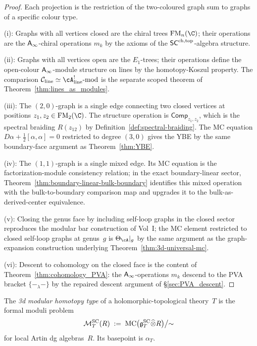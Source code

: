 \begin{proof}
Each projection is the restriction of the two-coloured graph sum
to graphs of a specific colour type.

(i): Graphs with all vertices closed are the chiral trees
$\FM_n(\C)$; their operations are the $\mathsf{A}_{\infty}$-chiral operations
$m_k$ by the axioms of the $\mathsf{SC}^{\mathrm{ch,top}}$-algebra structure.

(ii): Graphs with all vertices open are the $E_1$-trees; their
operations define the open-colour $\mathsf{A}_{\infty}$-module structure on lines
by the homotopy-Koszul property. The comparison
$\cC_{\mathrm{line}} \simeq \cA^!_{\mathrm{line}}\text{-mod}$ is the
separate scoped theorem of Theorem~\ref{thm:lines_as_modules}.

(iii): The $(2,0)$-graph is a single edge connecting two closed
vertices at positions $z_1, z_2 \in \FM_2(\C)$. The structure
operation is $\mathsf{Comp}_{z_1,z_2}$, which is the spectral
braiding $R(z_{12})$ by Definition~\ref{def:spectral-braiding}.
The MC equation $D\alpha + \tfrac{1}{2}[\alpha,\alpha] = 0$
restricted to degree $(3,0)$ gives the YBE by the same
boundary-face argument as Theorem~\ref{thm:YBE}.

(iv): The $(1,1)$-graph is a single mixed edge. Its MC equation is
the factorization-module consistency relation; in the exact
boundary-linear sector,
Theorem~\ref{thm:boundary-linear-bulk-boundary} identifies this
mixed operation with the bulk-to-boundary comparison map and upgrades
it to the bulk-as-derived-center equivalence.

(v): Closing the genus face by including self-loop graphs in the
closed sector reproduces the modular bar construction of Vol~I;
the MC element restricted to closed self-loop graphs at genus~$g$
is $\Theta_\cA|_{g}$ by the same argument as
the graph-expansion construction underlying Theorem~\ref{thm:3d-universal-mc}.

(vi): Descent to cohomology on the closed face is the content of
Theorem~\ref{thm:cohomology_PVA}: the $\mathsf{A}_{\infty}$-operations $m_k$
descend to the PVA bracket $\{-_\lambda-\}$ by the repaired
descent argument of \S\ref{sec:PVA_descent}.
\end{proof}

\begin{definition}
\label{def:3d-modular-homotopy-type}
The \emph{3d modular homotopy type} of a holomorphic-topological
theory~$T$ is the formal moduli problem
\[
\mathcal M^{\mathrm{SC}}_T(R)
\;:=\;
\operatorname{MC}\bigl(\mathfrak{g}^{\mathrm{SC}}_T \widehat{\otimes} R\bigr)\big/{\sim}
\]
for local Artin dg algebras~$R$. Its basepoint is $\alpha_T$.
\end{definition}

